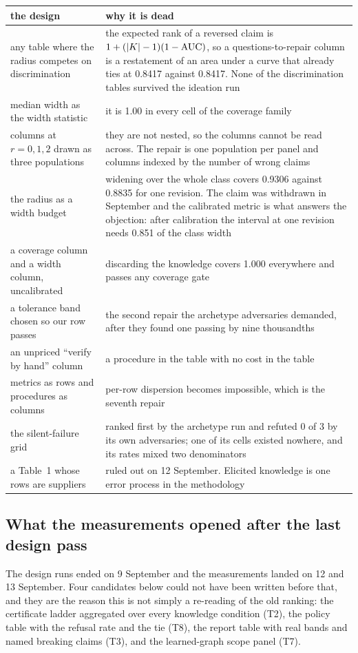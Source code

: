 \begin{center}\footnotesize
\begin{tabular}{@{}p{5.0cm}p{11.35cm}@{}}
\toprule
the design & why it is dead \\
\midrule
any table where the radius competes on discrimination &
the expected rank of a reversed claim is $1 + (|K| - 1)(1 - \mathrm{AUC})$, so a
questions-to-repair column is a restatement of an area under a curve that already ties at 0.8417
against 0.8417. None of the discrimination tables survived the ideation run \\
\addlinespace
median width as the width statistic &
it is 1.00 in every cell of the coverage family \\
\addlinespace
columns at $r = 0, 1, 2$ drawn as three populations &
they are not nested, so the columns cannot be read across. The repair is one population per panel
and columns indexed by the number of wrong claims \\
\addlinespace
the radius as a width budget &
widening over the whole class covers 0.9306 against 0.8835 for one revision. The claim was
withdrawn in September and the calibrated metric is what answers the objection: after calibration
the interval at one revision needs 0.851 of the class width \\
\addlinespace
a coverage column and a width column, uncalibrated &
discarding the knowledge covers 1.000 everywhere and passes any coverage gate \\
\addlinespace
a tolerance band chosen so our row passes &
the second repair the archetype adversaries demanded, after they found one passing by nine
thousandths \\
\addlinespace
an unpriced ``verify by hand'' column &
a procedure in the table with no cost in the table \\
\addlinespace
metrics as rows and procedures as columns &
per-row dispersion becomes impossible, which is the seventh repair \\
\addlinespace
the silent-failure grid &
ranked first by the archetype run and refuted 0 of 3 by its own adversaries; one of its cells
existed nowhere, and its rates mixed two denominators \\
\addlinespace
a Table~1 whose rows are suppliers &
ruled out on 12 September. Elicited knowledge is one error process in the methodology \\
\bottomrule
\end{tabular}
\end{center}

\subsection{What the measurements opened after the last design pass}

The design runs ended on 9 September and the measurements landed on 12 and 13 September. Four
candidates below could not have been written before that, and they are the reason this is not
simply a re-reading of the old ranking: the certificate ladder aggregated over every knowledge
condition (T2), the policy table with the refusal rate and the tie (T8), the report table with real
bands and named breaking claims (T3), and the learned-graph scope panel (T7).
